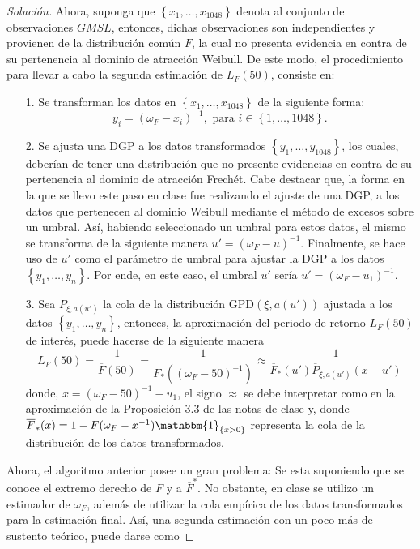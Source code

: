 \documentclass[10.5pt,notitlepage]{article}
\newenvironment{solucion}
  {\begin{proof}[Solución]}
  {\end{proof}}
\newcommand{\kis}[1]{\left\{ #1 \right\}}
\theoremstyle{plain}
\begin{document}
\begin{solucion}
Ahora, suponga que  \(\kis{x_1, \hdots ,x_{1048}}\) denota al conjunto de observaciones \(GMSL\), entonces, dichas observaciones son independientes y provienen de la distribución común \(F\), la cual no presenta evidencia en contra de su pertenencia al dominio de atracción Weibull. De este modo, el procedimiento para llevar a cabo la segunda estimación de \(L_{F}(50)\), consiste en:
\begin{itemize}
    \item[1.]  Se transforman los datos en \(\kis{x_1, \hdots ,x_{1048}}\) de la siguiente forma:
    \begin{equation}\label{trr}
         y_i = (\omega_{F} - x_i)^{-1}, \text{ para } i \in \kis{1, \hdots, 1048}.        
    \end{equation}
    \item[2.] Se ajusta una DGP a los datos transformados \(\kis{y_1, \hdots ,y_{1048}}\), los cuales, deberían de tener una distribución que no presente evidencias en contra de su pertenencia al dominio de atracción Frechét. Cabe destacar que, la forma en la que se llevo este paso en clase fue realizando el ajuste de una DGP, a los datos que pertenecen al dominio Weibull mediante el método de excesos sobre un umbral. Así, habiendo seleccionado un umbral para estos datos, el mismo se transforma de la siguiente manera \(u' = (\omega_{F} - u)^{-1}\). Finalmente, se hace uso de \(u'\) como el parámetro de umbral para ajustar la DGP a los datos \(\kis{y_1, \hdots ,y_n}\). Por ende, en este caso, el umbral \(u'\) sería \(u' = (\omega_{F} - u_1)^{-1}\).
    \item[3.] Sea \(\overline{P}_{\xi,a(u')}\) la cola de la distribución GPD\((\xi,a(u'))\) ajustada a los datos \(\kis{y_1, \hdots ,y_n}\), entonces, la aproximación del periodo de retorno \(L_{F}(50)\) de interés, puede hacerse de la siguiente manera
    \[
    L_{F}(50) = \frac{1}{\overline{F}(50)} = \frac{1}{\overline{F}_{*}((\omega_{F}- 50)^{-1 })} \approx \frac{1}{\overline{F}_{*}(u')\overline{P}_{\xi,a(u')}(x - u')} 
     \]
    donde, \(x = (\omega_{F}- 50)^{-1 } - u_1\), el signo \(\approx\) se debe interpretar como en la aproximación de la Proposición 3.3 de las notas de clase y, donde \(\overline{F}_{*}(x) = 1 - F(\omega_{F} - x^{-1})\mathbbm{1}_{\kis{x >0}}\) representa la cola de la distribución de los datos transformados. 
\end{itemize}
Ahora, el algoritmo anterior posee un gran problema: Se esta suponiendo que se conoce el extremo derecho de \(F\) y a \(\overline{F}^*\). No obstante, en clase se utilizo un estimador de \(\omega_{F}\), además de utilizar la cola empírica de los datos transformados para la estimación final. Así, una segunda estimación con un poco más de sustento teórico, puede darse como 

\end{solucion}
\end{document}
